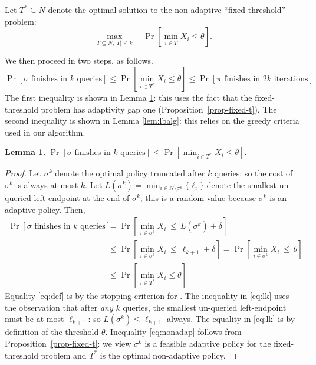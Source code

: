 \documentclass[11pt]{article}
\newtheorem{lem}[thm]{Lemma}
\theoremstyle{remark}
\theoremstyle{plain}
\theoremstyle{remark}
\begin{document}
Let $T^*\subseteq   N$ denote the optimal solution to the non-adaptive ``fixed threshold'' problem:
\begin{equation}
    \label{eq:t*}
\max_{T\subseteq N, |T|\le k}\quad \Pr\left[ \min_{i\in T}  X_i \le \theta\right].\end{equation}
 

We then proceed in  two steps, as follows.
$$        \Pr[\sigma\text{ finishes in }k \text{ queries}]  \leq \Pr\left[\min_{i \in T^*} X_i  \le  \theta\right] \leq \Pr[\pi \text{ finishes in }2k \text{ iterations}] 
$$ 
The first inequality is  shown in Lemma \ref{lem:exists}: this uses the fact that  the fixed-threshold problem 
has  adaptivity gap one (Proposition~\ref{prop-fixed-t}). The second inequality is  shown in Lemma \ref{lem:lbalg}: this relies on the greedy criteria used in our algorithm.





\begin{lem}
\label{lem:exists} $\Pr[\sigma\text{ finishes in }k \text{ queries}]  \leq \Pr\left[\min_{i \in T^*} X_i  \le  \theta\right]$.   
\end{lem}
\begin{proof}

Let  $\sigma^k$ denote the optimal policy truncated after $k$  queries: so the cost of $\sigma^k$ is always at most $k$. Let $L(\sigma^k)= \min_{i \in N \setminus {\sigma^k}} \{\ell_i\}$ denote the smallest un-queried left-endpoint at the end of $\sigma^k$; this is a random value because $\sigma^k$ is an adaptive policy. Then, 
\begin{align}
    \Pr[\sigma\text{ finishes in }k \text{ queries}] &= \Pr\left[ \min_{i \in \sigma^k} X_i \,\le \, L(\sigma^k)+ \delta \right] \label{eq:def}\\
    &\leq \Pr \left[ \min_{i \in \sigma^k} X_i  \,\le\, \ell_{k+1} + \delta \right]  = \Pr \left[ \min_{i \in \sigma^k} X_i  \,\le\, \theta\right] \label{eq:lk}\\
    & \le  \Pr\left[\min_{i \in T^*} X_i  \le  \theta\right]
    \label{eq:nonadap} 
\end{align}
Equality \eqref{eq:def} is  by the stopping criterion for \smq. The inequality in \eqref{eq:lk} uses   the observation that after {\em any} $k$  queries,  the smallest un-queried left-endpoint must be at most  $\ell_{k+1}$: so $L(\sigma^k)\le \ell_{k+1}$ always. The equality in \eqref{eq:lk} is by definition of the threshold $\theta$. Inequality  \eqref{eq:nonadap} follows from  Proposition~\ref{prop-fixed-t}: we view  $\sigma^k$ is a feasible adaptive policy for the fixed-threshold problem and $T^*$ is the optimal non-adaptive policy. 
 \end{proof}
\end{document}
